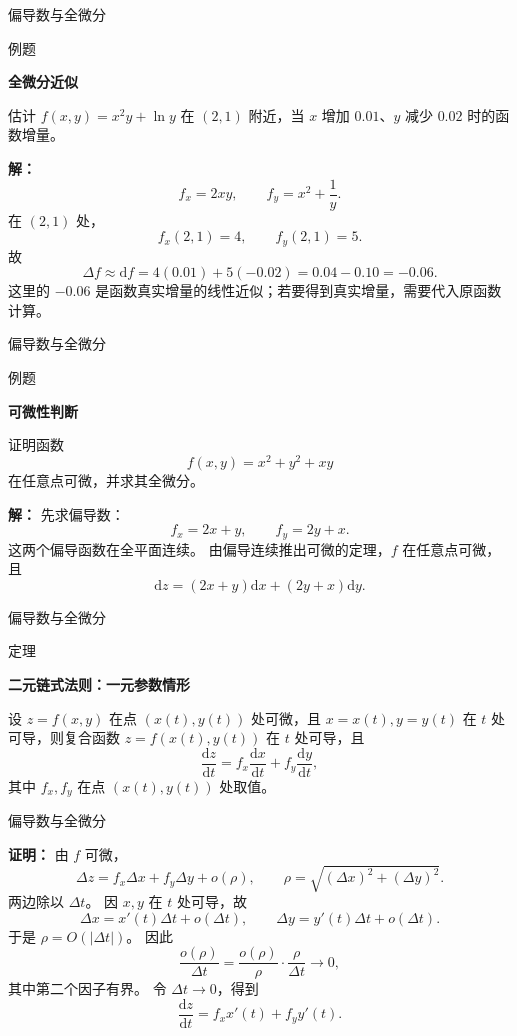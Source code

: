 \documentclass[aspectratio=169,10pt,fontset=fandol]{ctexbeamer}
\newcommand{\dd}{\mathrm{d}}
\begin{document}
\begin{frame}[t,fragile]{偏导数与全微分}
\small
\begin{block}{例题}
{\small
\textbf{全微分近似}\par

估计 $f(x,y)=x^2y+\ln y$ 在 $(2,1)$ 附近，当 $x$ 增加 $0.01$、$y$ 减少 $0.02$ 时的函数增量。

}
\end{block}
\pause
{\small
\textbf{解：}
\[
f_x=2xy,\qquad f_y=x^2+\frac1y.
\]
在 $(2,1)$ 处，
\[
f_x(2,1)=4,\qquad f_y(2,1)=5.
\]
故
\[
\Delta f\approx \dd f=4(0.01)+5(-0.02)=0.04-0.10=-0.06.
\]
这里的 $-0.06$ 是函数真实增量的线性近似；若要得到真实增量，需要代入原函数计算。

}
\end{frame}
\begin{frame}[t,fragile]{偏导数与全微分}
\small
\begin{block}{例题}
{\small
\textbf{可微性判断}\par

证明函数
\[
f(x,y)=x^2+y^2+xy
\]
在任意点可微，并求其全微分。

}
\end{block}
\pause
{\small
\textbf{解：}
先求偏导数：
\[
f_x=2x+y,\qquad f_y=2y+x.
\]
这两个偏导函数在全平面连续。 由偏导连续推出可微的定理，$f$ 在任意点可微，且
\[
\dd z=(2x+y)\dd x+(2y+x)\dd y.
\]

}
\end{frame}
\begin{frame}[t,fragile]{偏导数与全微分}
\normalsize
\begin{block}{定理}
{\normalsize
\textbf{二元链式法则：一元参数情形}\par

设 $z=f(x,y)$ 在点 $(x(t),y(t))$ 处可微，且 $x=x(t),y=y(t)$ 在 $t$ 处可导，则复合函数 $z=f(x(t),y(t))$ 在 $t$ 处可导，且
\[
\frac{\dd z}{\dd t}=f_x\frac{\dd x}{\dd t}+f_y\frac{\dd y}{\dd t},
\]
其中 $f_x,f_y$ 在点 $(x(t),y(t))$ 处取值。

}
\end{block}
\end{frame}
\begin{frame}[t,fragile]{偏导数与全微分}
\small
{\small
\textbf{证明：}
由 $f$ 可微，
\[
\Delta z=f_x\Delta x+f_y\Delta y+o(\rho),
\qquad \rho=\sqrt{(\Delta x)^2+(\Delta y)^2}.
\]
两边除以 $\Delta t$。 因 $x,y$ 在 $t$ 处可导，故
\[
\Delta x=x'(t)\Delta t+o(\Delta t),\qquad
\Delta y=y'(t)\Delta t+o(\Delta t).
\]
于是 $\rho=O(|\Delta t|)$。 因此
\[
\frac{o(\rho)}{\Delta t}
=\frac{o(\rho)}{\rho}\cdot\frac{\rho}{\Delta t}\to0,
\]
其中第二个因子有界。 令 $\Delta t\to0$，得到
\[
\frac{\dd z}{\dd t}=f_x x'(t)+f_y y'(t).
\]

}
\end{frame}
\end{document}

